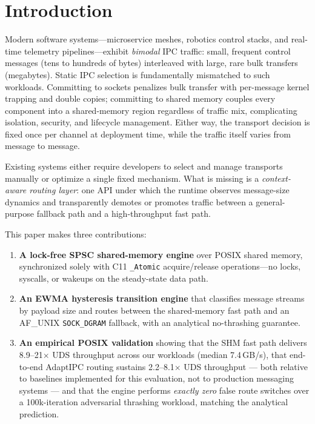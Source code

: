 \documentclass[conference]{IEEEtran}
\begin{document}
\section{Introduction}
Modern software systems---microservice meshes, robotics control stacks, and
real-time telemetry pipelines---exhibit \emph{bimodal} IPC traffic: small,
frequent control messages (tens to hundreds of bytes) interleaved with large,
rare bulk transfers (megabytes). Static IPC selection is fundamentally
mismatched to such workloads. Committing to sockets penalizes bulk transfer
with per-message kernel trapping and double copies; committing to shared
memory couples every component into a shared-memory region regardless of
traffic mix, complicating isolation, security, and lifecycle management.
Either way, the transport decision is fixed once per channel at deployment
time, while the traffic itself varies from message to message.

Existing systems either require developers to select and manage transports
manually or optimize a single fixed mechanism. What is missing is a
\emph{context-aware routing layer}: one API under which the runtime observes
message-size dynamics and transparently demotes or promotes traffic between a
general-purpose fallback path and a high-throughput fast path.

This paper makes three contributions:
\begin{enumerate}
\item \textbf{A lock-free SPSC shared-memory engine} over POSIX shared
memory, synchronized solely with C11 \texttt{\_Atomic} acquire/release
operations---no locks, syscalls, or wakeups on the steady-state data path.
\item \textbf{An EWMA hysteresis transition engine} that classifies message
streams by payload size and routes between the shared-memory fast path and an
AF\_UNIX \texttt{SOCK\_DGRAM} fallback, with an analytical no-thrashing
guarantee.
\item \textbf{An empirical POSIX validation} showing that the SHM fast path
delivers 8.9--21$\times$ UDS throughput across our workloads (median
7.4\,GB/s), that end-to-end AdaptIPC routing sustains 2.2--8.1$\times$ UDS
throughput --- both relative to baselines implemented for this evaluation,
not to production messaging systems --- and that the engine performs \emph{exactly zero} false route
switches over a 100k-iteration adversarial thrashing workload, matching the
analytical prediction.
\end{enumerate}
\end{document}
